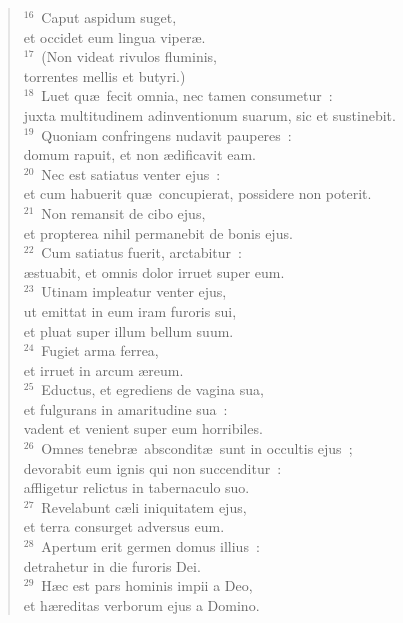 \begin{flushleft}
\begin{verse}
${}^{16}$~Caput aspidum suget,\\ et occidet eum lingua viper\ae .\\
${}^{17}$~(Non videat rivulos fluminis,\\ torrentes mellis et butyri.)\\
${}^{18}$~Luet qu\ae\ fecit omnia, nec tamen consumetur~:\\ juxta multitudinem adinventionum suarum, sic et sustinebit.\\
${}^{19}$~Quoniam confringens nudavit pauperes~:\\ domum rapuit, et non \ae dificavit eam.\\
${}^{20}$~Nec est satiatus venter ejus~:\\ et cum habuerit qu\ae\ concupierat, possidere non poterit.\\
${}^{21}$~Non remansit de cibo ejus,\\ et propterea nihil permanebit de bonis ejus.\\
${}^{22}$~Cum satiatus fuerit, arctabitur~:\\ \ae stuabit, et omnis dolor irruet super eum.\\
${}^{23}$~Utinam impleatur venter ejus,\\ ut emittat in eum iram furoris sui,\\ et pluat super illum bellum suum.\\
${}^{24}$~Fugiet arma ferrea,\\ et irruet in arcum \ae reum.\\
${}^{25}$~Eductus, et egrediens de vagina sua,\\ et fulgurans in amaritudine sua~:\\ vadent et venient super eum horribiles.\\
${}^{26}$~Omnes tenebr\ae\ abscondit\ae\ sunt in occultis ejus~;\\ devorabit eum ignis qui non succenditur~:\\ affligetur relictus in tabernaculo suo.\\
${}^{27}$~Revelabunt c\ae li iniquitatem ejus,\\ et terra consurget adversus eum.\\
${}^{28}$~Apertum erit germen domus illius~:\\ detrahetur in die furoris Dei.\\
${}^{29}$~H\ae c est pars hominis impii a Deo,\\ et h\ae reditas verborum ejus a Domino.\end{verse}\end{flushleft}


